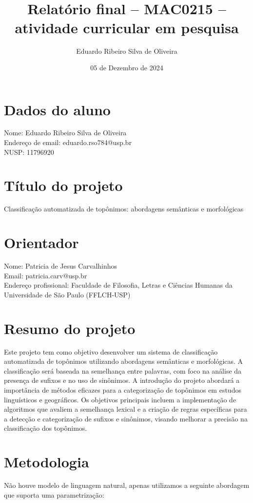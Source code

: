 \documentclass{article}
\title{Relatório final – MAC0215 – atividade curricular em pesquisa}
\author{Eduardo Ribeiro Silva de Oliveira}
\date{05 de Dezembro de 2024}
\begin{document}
\maketitle

\section*{Dados do aluno}
Nome: Eduardo Ribeiro Silva de Oliveira\\
Endereço de email: eduardo.rso784@usp.br\\
NUSP: 11796920

\section*{Título do projeto}
Classificação automatizada de topônimos: abordagens semânticas e morfológicas

\section*{Orientador}
Nome: Patricia de Jesus Carvalhinhos \\
Email: patricia.carv@usp.br\\
Endereço profissional: Faculdade de Filosofia, Letras e Ciências Humanas da Universidade de São Paulo (FFLCH-USP)

\section*{Resumo do projeto}
Este projeto tem como objetivo desenvolver um sistema de classificação automatizada de topônimos utilizando abordagens semânticas e morfológicas. A classificação será baseada na semelhança entre palavras, com foco na análise da presença de sufixos e no uso de sinônimos. A introdução do projeto abordará a importância de métodos eficazes para a categorização de topônimos em estudos linguísticos e geográficos. Os objetivos principais incluem a implementação de algoritmos que avaliem a semelhança lexical e a criação de regras específicas para a detecção e categorização de sufixos e sinônimos, visando melhorar a precisão na classificação dos topônimos.

\section*{Metodologia}
Não houve modelo de linguagem natural, apenas utilizamos a seguinte abordagem que suporta uma parametrização:
\end{document}
